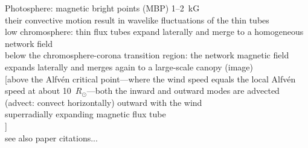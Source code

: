 Photosphere: magnetic bright points (MBP) 1--2~kG\\ %
their convective motion result in wavelike fluctuations of the thin tubes\\
low chromosphere: thin flux tubes expand laterally and merge to a homogeneous network field\\
below the chromosphere-corona transition region: the network magnetic field expands laterally and merges again to a large-scale canopy (image)\\

[above the Alfv\'en critical point---where the wind speed equals the local Alfv\'en speed at about 10~$R_\odot$---both the inward and outward modes are advected (advect: convect horizontally) outward with the wind\\
superradially expanding magnetic flux tube\\
\citep{Cranmer2005}]\\
see also paper citations...\\

